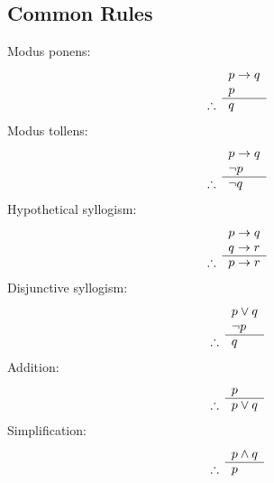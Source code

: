 \subsection{Common Rules}
Modus ponens:
\begin{equation}
    \begin{array}{r l}
                   & p \rightarrow q \\
                   & p               \\
        \cline{2-2}
        \therefore & q
    \end{array}
\end{equation}
Modus tollens:
\begin{equation}
    \begin{array}{r l}
                   & p \rightarrow q \\
                   & \neg p          \\
        \cline{2-2}
        \therefore & \neg q
    \end{array}
\end{equation}
Hypothetical syllogism:
\begin{equation}
    \begin{array}{r l}
                   & p \rightarrow q \\
                   & q \rightarrow r \\
        \cline{2-2}
        \therefore & p \rightarrow r
    \end{array}
\end{equation}
Disjunctive syllogism:
\begin{equation}
    \begin{array}{r l}
                   & p \lor q \\
                   & \neg p   \\
        \cline{2-2}
        \therefore & q
    \end{array}
\end{equation}
Addition:
\begin{equation}
    \begin{array}{r l}
                   & p        \\
        \cline{2-2}
        \therefore & p \lor q
    \end{array}
\end{equation}
Simplification:
\begin{equation}
    \begin{array}{r l}
                   & p \land q \\
        \cline{2-2}
        \therefore & p
    \end{array}
\end{equation}
